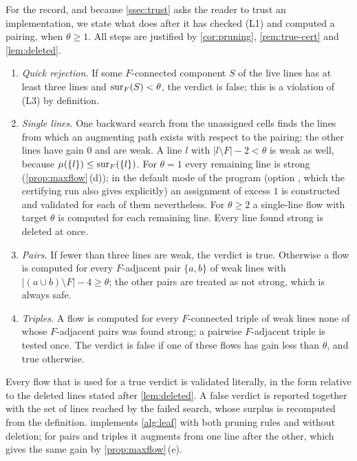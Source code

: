 For the record, and because \cref{ssec:trust} asks the reader to trust an implementation, we state what
 does after it has checked (L1) and computed a pairing, when $\theta\ge1$. All
steps are justified by \cref{cor:pruning}, \cref{rem:true-cert} and \cref{lem:deleted}.
\begin{enumerate}[label=(\arabic*),leftmargin=2.2em]
\item \emph{Quick rejection.} If some $F$-connected component $S$ of the live lines has at least three
  lines and $\operatorname{sur}_F(S)<\theta$, the verdict is false; this is a violation of (L3) by definition.
\item \emph{Single lines.} One backward search from the unassigned cells finds the lines from which an
  augmenting path exists with respect to the pairing; the other lines have gain $0$ and are weak. A line
  $l$ with $|l\setminus F|-2<\theta$ is weak as well, because $\mu(\{l\})\le\operatorname{sur}_F(\{l\})$. For
  $\theta=1$ every remaining line is strong (\cref{prop:maxflow}\,(d)); in the default mode of the
  program (option , which the certifying run also gives explicitly) an assignment of excess $1$
  is constructed and validated for each of them nevertheless. For $\theta\ge 2$ a single-line flow with
  target $\theta$ is computed for each remaining line. Every line found strong is deleted at once.
\item \emph{Pairs.} If fewer than three lines are weak, the verdict is true. Otherwise a flow is computed
  for every $F$-adjacent pair $\{a,b\}$ of weak lines with $|(a\cup b)\setminus F|-4\ge\theta$; the other
  pairs are treated as not strong, which is always safe.
\item \emph{Triples.} A flow is computed for every $F$-connected triple of weak lines none of whose
  $F$-adjacent pairs was found strong; a pairwise $F$-adjacent triple is tested once. The verdict is
  false if one of these flows has gain less than $\theta$, and true otherwise.
\end{enumerate}
Every flow that is used for a true verdict is validated literally, in the form relative to the deleted
lines stated after \cref{lem:deleted}. A false verdict is reported together with the set of lines reached by the failed
search, whose surplus is recomputed from the definition.  implements
\cref{alg:leaf} with both pruning rules and without deletion; for pairs and triples it augments from one
line after the other, which gives the same gain by \cref{prop:maxflow}\,(e).

